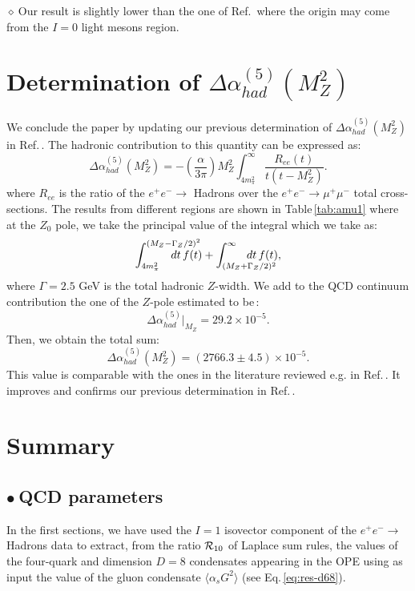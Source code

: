 \documentclass[review]{elsarticle}
\def\beq{\begin{equation}}
\def\eeq{\end{equation}}
\def\ga{\left(}
\def\dr{\right)}
\def\la{\langle}
\def\ra{\rangle}
\def\b{$\bullet~$}
\def\d{$\diamond~$}
\begin{document}
\d Our result is slightly lower than the one of Ref.\,\cite{NOMURA} where the origin may come from the $I=0$ light mesons region. 

\section{Determination of $ \Delta \alpha_{had}^{(5)} (M_Z^2)$}
We conclude the paper by updating our previous determination of $\Delta \alpha_{had}^{(5)} (M_Z^2)$ in Ref.\,\cite{SNalfa}. The hadronic contribution to this quantity can be expressed as:
\beq
\Delta \alpha_{had}^{(5)} (M_Z^2)=-\ga \frac{\alpha}{3\pi}\dr M^2_Z\int_{4m_\pi^2}^\infty \frac{R_{ee}(t)}{t(t-M_Z^2)}.
\eeq
where $R_{ee}$ is the ratio of the $e^+e^-\to$ Hadrons over the  $e^+e^-\to \mu^+\mu^-$ total cross-sections. 
The results from different regions are shown in Table\,\ref{tab:amu1} where at the  $Z_0$ pole, we take the principal value of the integral which we take as:
\beq
\int_{4m_\pi^2}^{(M_Z- \Gamma_Z/2)^2}\hspace*{-1cm} dt\,f(t)+\int_{(M_Z+ \Gamma_Z/2)^2}^{\infty}\hspace*{-1cm}dt\,f(t),
\eeq
where $\Gamma =2.5$ GeV is the total hadronic $Z$-width. We add to the QCD continuum contribution the one of the $Z$-pole estimated to be\,\cite{YND17}:
\beq
\Delta \alpha_{had}^{(5)}\vert_{M_Z}= 29.2\times 10^{-5}.
\eeq
Then, we obtain the total sum:
\beq
\Delta \alpha_{had}^{(5)} (M_Z^2)= (2766.3\pm 4.5)\times 10^{-5}. 
\eeq 
This value is comparable with the ones in the literature reviewed e.g. in Ref.\,\cite{JEGER}.  It improves and confirms our previous determination in Ref.\,\cite{SNalfa}. 
\section{Summary}
\subsection*{\b QCD parameters}

In the first sections, we have used the $I=1$ isovector component of the $e^+e^-\to$ Hadrons data to extract, from the ratio ${\cal R}_{10}$ of Laplace sum rules, the values of the four-quark and dimension $D=8$ condensates appearing in the OPE using as input the value of the gluon condensate $\la\alpha_s G^2\ra$ (see Eq.\,\ref{eq:res-d68}). 
\end{document}
